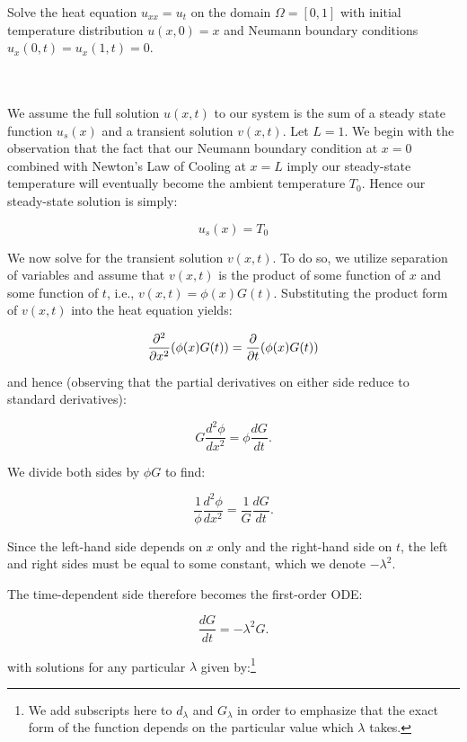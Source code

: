 Solve the heat equation $u_{xx} = u_t$ on the domain $\Omega = [0, 1]$ with initial temperature distribution 
$u(x, 0) = x$ and Neumann boundary conditions $u_x(0, t) = u_x(1, t) = 0$.

\begin{solution}\ \\\\
    We assume the full solution $u(x, t)$ to our system is the sum of a steady state function $u_s(x)$ and a transient 
    solution $v(x, t)$. Let $L = 1$. We begin with the observation that the fact that our Neumann boundary condition 
    at $x = 0$ combined with Newton's Law of Cooling at $x = L$ imply our steady-state temperature will eventually become
    the ambient temperature $T_0$. Hence our steady-state solution is simply:

    $$
        u_s(x) = T_0
    $$

    We now solve for the transient solution $v(x, t)$.  To do so, we utilize separation 
    of variables and assume that $v(x, t)$ is the product of some function of $x$ and some function of $t$, i.e., 
    $v(x, t) = \phi(x) G(t)$. Substituting the product form of $v(x, t)$ into the heat equation yields:

    $$
        \frac{\partial^2}{\partial x^2} (\phi(x) G(t)) = \frac{\partial}{\partial t} (\phi(x) G(t)) \\
    $$

    and hence (observing that the partial derivatives on either side reduce to standard derivatives):

    $$
        G \frac{d^2 \phi}{d x^2} = \phi \frac{d G}{d t}.
    $$

    We divide both sides by $\phi G$ to find:

    $$
        \frac{1}{\phi} \frac{d^2 \phi}{d x^2} = \frac{1}{G} \frac{d G}{d t}.
    $$

    Since the left-hand side depends on $x$ only and the right-hand side on $t$, the left and right sides must be equal
    to some constant, which we denote $-\lambda^2$.

    The time-dependent side therefore becomes the first-order ODE:

    $$
        \frac{d G}{d t} = -\lambda^2 G.
    $$

    with solutions for any particular $\lambda$ given by:\footnote{
        We add subscripts here to $d_{\lambda}$ and $G_{\lambda}$ in order to emphasize that the exact form of the 
        function depends on the particular value which $\lambda$ takes.
    }


\end{solution}
